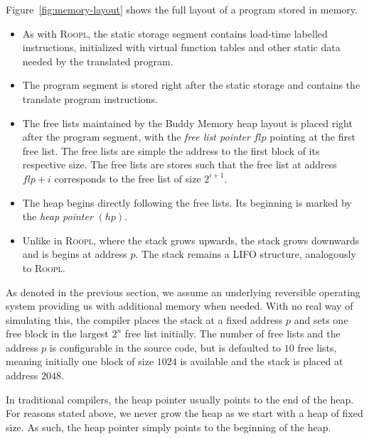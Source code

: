 Figure~\ref{fig:memory-layout} shows the full layout of a \rooplpp program stored in memory.

\begin{itemize}
    \item As with \textsc{Roopl}, the static storage segment contains load-time labelled  instructions, initialized with virtual function tables and other static data needed by the translated program.

    \item The program segment is stored right after the static storage and contains the translate \rooplpp program instructions.

    \item The free lists maintained by the Buddy Memory heap layout is placed right after the program segment, with the \textit{free list pointer} $flp$ pointing at the first free list. The free lists are simple the address to the first block of its respective size. The free lists are stores such that the free list at address $flp + i$ corresponds to the free list of size $2^{i+1}$.   

    \item The heap begins directly following the free lists. Its beginning is marked by the \textit{heap pointer} $(hp)$. 

    \item Unlike in \textsc{Roopl}, where the stack grows upwards, the \rooplpp stack grows downwards and is begins at address $p$. The stack remains a LIFO structure, analogously to \textsc{Roopl}.
\end{itemize}

As denoted in the previous section, we assume an underlying reversible operating system providing us with additional memory when needed. With no real way of simulating this, the \rooplpp compiler places the stack at a fixed address $p$ and sets one free block in the largest $2^n$ free list initially. The number of free lists and the address $p$ is configurable in the source code, but is defaulted to $10$ free lists, meaning initially one block of size $1024$ is available and the stack is placed at address $2048$.

In traditional compilers, the heap pointer usually points to the end of the heap. For reasons stated above, we never grow the heap as we start with a heap of fixed size. As such, the heap pointer simply points to the beginning of the heap.

